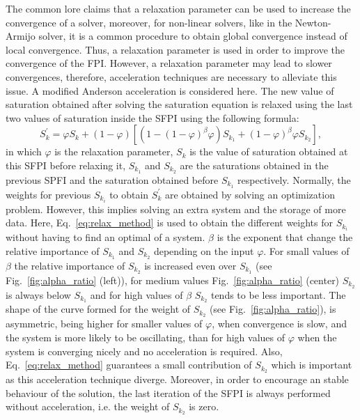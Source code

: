 The common lore claims that a relaxation parameter can be used to increase the convergence of a solver, moreover, for non-linear solvers, like in the Newton-Armijo solver, it is a common procedure to obtain global convergence instead of local convergence. Thus, a relaxation parameter is used in order to improve the convergence of the FPI. However, a relaxation parameter may lead to slower convergences, therefore, acceleration techniques are necessary to alleviate this issue. A modified Anderson acceleration is considered here.
The new value of saturation obtained after solving the saturation equation is relaxed using the last two values of saturation inside the SFPI using the following formula:
\begin{equation}
{S^\prime_k} = \varphi S_k + (1-\varphi) [ (1-(1-\varphi)^\beta \varphi) S_{k_1} + (1-\varphi)^\beta \varphi S_{k_2}],
\label{eq:relax_method}
\end{equation}
in which $\varphi$ is the relaxation parameter, $S_{k}$ is the value of saturation obtained at this SFPI before relaxing it, $S_{k_1}$ and $S_{k_2}$ are the saturations obtained in the previous SPFI and the saturation obtained before $S_{k_1}$ respectively. 
Normally, the weights for previous $S_{k_i}$ to obtain ${S^\prime_k}$ are obtained by solving an optimization problem. However, this implies solving an extra system and the storage of more data. 
Here, Eq.~\ref{eq:relax_method} is used to obtain the different weights for $S_{k_i}$ without having to find an optimal of a system. 
$\beta$ is the exponent that change the relative importance of $S_{k_1}$ and $S_{k_2}$ depending on the input $\varphi$. For small values of $\beta$ the relative importance of $S_{k_2}$ is increased even over $S_{k_1}$ (see Fig.~\ref{fig:alpha_ratio} (left)), for medium values Fig.~\ref{fig:alpha_ratio} (center) $S_{k_2}$ is always below $S_{k_1}$ and for high values of $\beta$ $S_{k_2}$ tends to be less important. The shape of the curve formed for the weight of $S_{k_2}$ (see Fig.~\ref{fig:alpha_ratio}), is asymmetric, being higher for smaller values of $\varphi$, when convergence is slow, and the system is more likely to be oscillating, than for high values of $\varphi$ when the system is converging nicely and no acceleration is required. Also, Eq.~\ref{eq:relax_method} guarantees a small contribution of $S_{k_2}$ which is important as this acceleration technique diverge. Moreover, in order to encourage an stable behaviour of the solution, the last iteration of the SFPI is always performed without acceleration, i.e. the weight of $S_{k_2}$ is zero.


